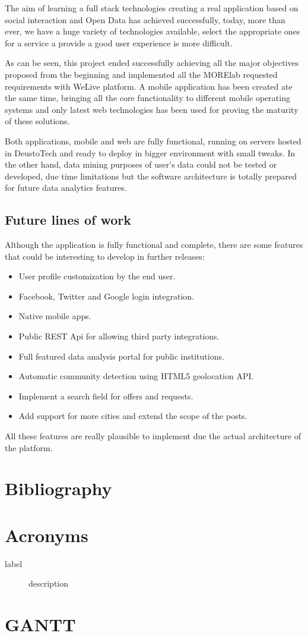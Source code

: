 \documentclass{DeustoFDP}
\begin{document}
The aim of learning a full stack technologies creating a real application based on social interaction and Open Data has achieved successfully, today, more than ever, we have a huge variety of technologies available, select the appropriate ones for a service a provide a good user experience is more difficult.

As can be seen, this project ended successfully achieving all the major objectives proposed from the beginning and implemented all the MORElab requested requirements with WeLive platform. A mobile application has been created ate the same time, bringing all the core functionality to different mobile operating systems and only latest web technologies has been used for proving the maturity of these solutions.

Both applications, mobile and web are fully functional, running on servers hosted in DeustoTech and ready to deploy in bigger environment with small tweaks. In the other hand, data mining purposes of user's data could not be tested or developed, due time limitations but the software architecture is totally prepared for future data analytics features.

\section{Future lines of work}
Although the application is fully functional and complete, there are some features that could be interesting to develop in further releases:

\begin{itemize}
	\item User profile customization by the end user.
	\item Facebook, Twitter and Google login integration.
	\item Native mobile apps.
	\item Public REST Api for allowing third party integrations.
	\item Full featured data analysis portal for public institutions.
	\item Automatic community detection using HTML5 geolocation API.
	\item Implement a search field for offers and requests.
	\item Add support for more cities and extend the scope of the posts.
\end{itemize}

All these features are really plausible to implement due the actual architecture of the platform.

\chapter{Bibliography}\label{cha:bibliography}
\printbibliography[heading=bibintoc]
\chapter{Acronyms}\label{cha:acronyms}
\begin{description}
	\item[label] description
\end{description}

\appendix

\chapter{GANTT}\label{cha:gantt}


\backmatter
\end{document}
